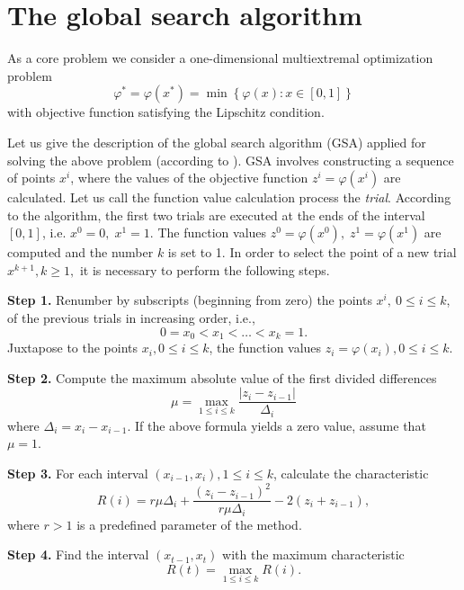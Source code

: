 \documentclass[runningheads]{llncs}
\begin{document}
\section{The global search algorithm}
\label{SectionCore}

As a core problem we consider a one-dimensional multiextremal optimization 
problem
\begin{equation}\label{uni_problem}
\varphi^\ast = \varphi(x^\ast)=\min{\left\{\varphi(x):x\in \left[0,1\right] 
\right\}}
\end{equation}
with objective function satisfying the Lipschitz condition. 

Let us give the description of the global search algorithm (GSA) applied for 
solving the above problem (according to \cite{Strongin2000}). 
GSA involves constructing a sequence of points $x^i$, where the values of the 
objective function $z^i=\varphi(x^i)$ are calculated. Let us call the 
function value calculation process the \textit{trial}. 
According to the algorithm, the first two trials are executed at the ends of 
the interval  $[0,1]$, i.e. $x^0=0,\;x^1=1$. The function values $z^0=\varphi
(x^0),\;z^1=\varphi(x^1)$  are computed and the number $k$ is set to 1. In 
order to select the point of a new trial $x^{k+1}, k\geq 1,$  it is necessary 
to perform the following steps.

\textbf{Step 1.} Renumber by subscripts (beginning from zero) the points $x^i,
\:0\leq i\leq k$, of the previous trials in increasing order, i.e.,
\[
0=x_0<x_1<\ldots <x_{k}=1.
\] 
Juxtapose to the points $x_i, 0\leq i\leq k$,  the function values $z_i=
\varphi(x_i), 0\leq i\leq k$.

\textbf{Step 2.} Compute the maximum absolute value of the first divided 
differences 
\begin{equation}\label{mu}
\mu=\max_{1\leq i\leq k}\frac{\left|z_i-z_{i-1}\right|}{\Delta_i}
\end{equation}
where $\Delta_i = x_i-x_{i-1}$. If the above formula yields a zero value, 
assume that $\mu = 1$.

\textbf{Step 3.} For each interval $(x_{i-1},x_i),1\leq i\leq k$,  calculate 
the characteristic
\begin{equation}\label{R}
R(i)=r\mu\Delta_i+\frac{(z_i-z_{i-1})^2}{r\mu\Delta_i}-2(z_i+z_{i-1}),
\end{equation} 
where $r>1$ is a predefined parameter of the method. 

\textbf{Step 4.} Find the interval $(x_{t-1},x_t)$ with the maximum 
characteristic
\begin{equation}\label{MaxR}
R(t)=\max_{1\leq i\leq {k}}R(i).
\end{equation}  
\end{document}
